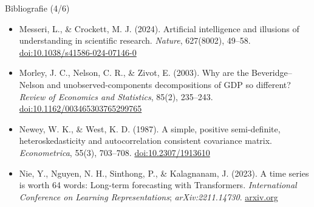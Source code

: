 \begin{frame}{Bibliografie (4/6)}
\begin{itemize}
    \item Messeri, L., \& Crockett, M. J. (2024). Artificial intelligence and illusions of understanding in scientific research. \textit{Nature}, 627(8002), 49--58. \href{https://doi.org/10.1038/s41586-024-07146-0}{doi:10.1038/s41586-024-07146-0}
    \item Morley, J. C., Nelson, C. R., \& Zivot, E. (2003). Why are the Beveridge--Nelson and unobserved-components decompositions of GDP so different? \textit{Review of Economics and Statistics}, 85(2), 235--243. \href{https://doi.org/10.1162/003465303765299765}{doi:10.1162/003465303765299765}
    \item Newey, W. K., \& West, K. D. (1987). A simple, positive semi-definite, heteroskedasticity and autocorrelation consistent covariance matrix. \textit{Econometrica}, 55(3), 703--708. \href{https://doi.org/10.2307/1913610}{doi:10.2307/1913610}
    \item Nie, Y., Nguyen, N. H., Sinthong, P., \& Kalagnanam, J. (2023). A time series is worth 64 words: Long-term forecasting with Transformers. \textit{International Conference on Learning Representations}; \textit{arXiv:2211.14730}. \href{https://arxiv.org/abs/2211.14730}{arxiv.org}
\end{itemize}
\end{frame}

